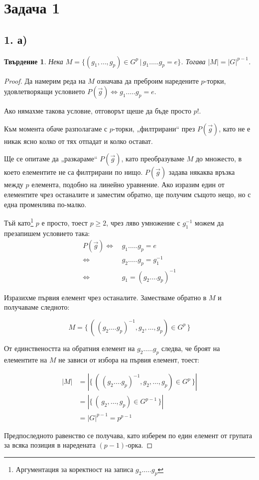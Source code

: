\documentclass{article}
\newtheorem*{prop}{Твърдение}
\theoremstyle{definition}
\begin{document}
\section*{Задача 1}%

\subsection*{1. а)}
\begin{prop}
    Нека $M = \{(g_1, \dots, g_p) \in G^p \, | \, g_1.\dots.g_p = e\}$.
    Тогава $|M| = |G|^{p-1}$.
\end{prop}
\begin{proof}
    Да намерим реда на $M$ означава да преброим наредените $p$-торки, удовлетворяащи условието
    $P(\vec g) \Leftrightarrow {g_1.\dots. g_p = e}$.

    Ако нямахме такова условие, отговорът щеше да бъде просто $p!$.

    Към момента обаче разполагаме с $p$-торки, „филтрирани“ през $P(\vec g)$, като не е никак ясно колко от тях отпадат и колко остават.

    Ще се опитаме да „разкараме“ $P(\vec g)$, като преобразуваме $M$ до множесто, в което елементите не са филтрирани по нищо.
    $P(\vec g)$ задава някаква връзка между $p$ елемента, подобно на линейно уравнение. Ако изразим един от елементите чрез останалите и заместим обратно, ще получим същото нещо, но с една променлива по-малко.

    Тъй като\footnote{Аргументация за коректност на записа $g_2 . \dots . g_p$} $p$ е просто, тоест $p \ge 2$, чрез ляво умножение с $g_1^{-1}$ можем да презапишем условието така:
    \begin{align*}
        P(\vec g) \Leftrightarrow \, &g_1.\dots.g_p = e \\
        \Leftrightarrow \, &g_2. \dots . g_p = g_1^{-1} \\
        \Leftrightarrow \, &g_1 = (g_2 . \dots g_p)^{-1}
    \end{align*}

    Изразихме първия елемент чрез останалите. Заместваме обратно в $M$ и получаваме следното:

    $$M = \{ \, (\,(g_2 . \dots g_p)^{-1}, g_2, \dots, g_p) \in G^p \,\}$$

    От единствеността на обратния елемент на $g_2.\dots.g_p$ следва, че броят на елементите на $M$ не зависи от избора на първия елемент, тоест:

    \begin{align*}
        |M| &= |\{ \, (\,(g_2 . \dots g_p)^{-1}, g_2, \dots, g_p) \in G^p \,\}|\\
        &= |\{ \, (\, g_2, \dots, g_p) \in G^{p-1} \,\}|\\
        &= {|G|}^{p-1} = p^{p-1}
    \end{align*}

Предпоследното равенство се получава, като изберем по един елемент от групата за всяка позиция в наредената ${(p-1)}$-орка.
\end{proof}
\end{document}
